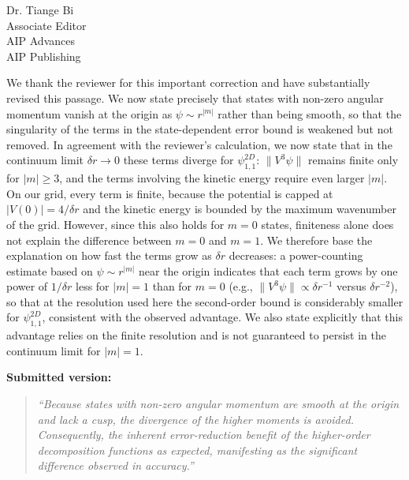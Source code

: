 \documentclass[11pt]{letter}
\begin{document}
\begin{letter}{Dr. Tiange Bi \\ Associate Editor \\ AIP Advances \\ AIP Publishing}
\begin{enumerate}
We thank the reviewer for this important correction and have substantially
revised this passage. We now state precisely that states with non-zero angular
momentum vanish at the origin as $\psi\sim r^{|m|}$ rather than being smooth,
so that the singularity of the terms in the state-dependent error bound is
weakened but not removed. In agreement with the reviewer's calculation, we now
state that in the continuum limit $\delta r\to0$ these terms diverge for
$\psi^{2D}_{1,1}$: $\|V^3\psi\|$ remains finite only for $|m|\ge3$, and the
terms involving the kinetic energy require even larger $|m|$. On our grid,
every term is finite, because the potential is capped at $|V(0)|=4/\delta r$
and the kinetic energy is bounded by the maximum wavenumber of the grid.
However, since this also holds for $m=0$ states, finiteness alone does not
explain the difference between $m=0$ and $m=1$. We therefore base the
explanation on how fast the terms grow as $\delta r$ decreases: a
power-counting estimate based on $\psi\sim r^{|m|}$ near the origin indicates
that each term grows by one power of $1/\delta r$ less for $|m|=1$ than for
$m=0$ (e.g., $\|V^3\psi\|\propto\delta r^{-1}$ versus $\delta r^{-2}$), so that
at the resolution used here the second-order bound is considerably smaller for
$\psi^{2D}_{1,1}$, consistent with the observed advantage. We also state
explicitly that this advantage relies on the finite resolution and is not
guaranteed to persist in the continuum limit for $|m|=1$.

\smallskip
\noindent\textbf{Submitted version:}
\begin{quote}
\itshape
``Because states with non-zero angular momentum are smooth at the origin and
lack a cusp, the divergence of the higher moments is avoided. Consequently,
the inherent error-reduction benefit of the higher-order decomposition
functions as expected, manifesting as the significant difference observed in
accuracy.''
\end{quote}


\end{enumerate}
\end{letter}
\end{document}
